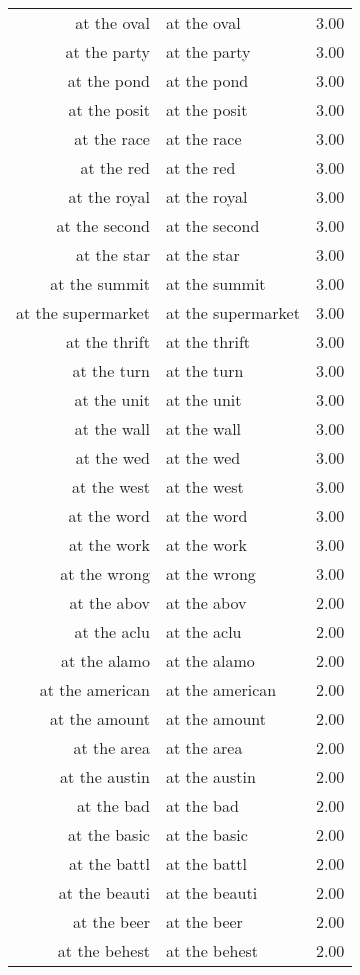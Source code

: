 \begin{table}[ht]
\begin{tabular}{rlr}
  at the oval & at the oval & 3.00 \\ 
  at the party & at the party & 3.00 \\ 
  at the pond & at the pond & 3.00 \\ 
  at the posit & at the posit & 3.00 \\ 
  at the race & at the race & 3.00 \\ 
  at the red & at the red & 3.00 \\ 
  at the royal & at the royal & 3.00 \\ 
  at the second & at the second & 3.00 \\ 
  at the star & at the star & 3.00 \\ 
  at the summit & at the summit & 3.00 \\ 
  at the supermarket & at the supermarket & 3.00 \\ 
  at the thrift & at the thrift & 3.00 \\ 
  at the turn & at the turn & 3.00 \\ 
  at the unit & at the unit & 3.00 \\ 
  at the wall & at the wall & 3.00 \\ 
  at the wed & at the wed & 3.00 \\ 
  at the west & at the west & 3.00 \\ 
  at the word & at the word & 3.00 \\ 
  at the work & at the work & 3.00 \\ 
  at the wrong & at the wrong & 3.00 \\ 
  at the abov & at the abov & 2.00 \\ 
  at the aclu & at the aclu & 2.00 \\ 
  at the alamo & at the alamo & 2.00 \\ 
  at the american & at the american & 2.00 \\ 
  at the amount & at the amount & 2.00 \\ 
  at the area & at the area & 2.00 \\ 
  at the austin & at the austin & 2.00 \\ 
  at the bad & at the bad & 2.00 \\ 
  at the basic & at the basic & 2.00 \\ 
  at the battl & at the battl & 2.00 \\ 
  at the beauti & at the beauti & 2.00 \\ 
  at the beer & at the beer & 2.00 \\ 
  at the behest & at the behest & 2.00 \\ 

\end{tabular}
\end{table}
